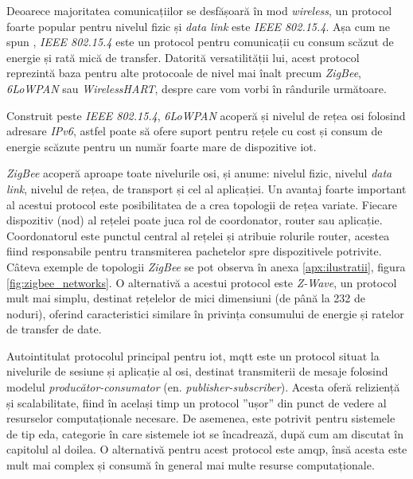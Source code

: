 Deoarece majoritatea comunicațiilor se desfășoară în mod \textit{wireless}, un protocol foarte popular pentru nivelul fizic și \textit{data link} este \textit{IEEE 802.15.4}. Așa cum ne spun \citet{Lin2017}, \textit{IEEE 802.15.4} este un protocol pentru comunicații cu consum scăzut de energie și rată mică de transfer. Datorită versatilității lui, acest protocol reprezintă baza pentru alte protocoale de nivel mai înalt precum \textit{ZigBee}, \textit{6LoWPAN} sau \textit{WirelessHART}, despre care vom vorbi în rândurile următoare.

Construit peste \textit{IEEE 802.15.4}, \textit{6LoWPAN} acoperă și nivelul de rețea \acrshort{osi} folosind adresare \textit{IPv6}, astfel poate să ofere suport pentru rețele cu cost și consum de energie scăzute pentru un număr foarte mare de dispozitive \acrshort{iot}.

\textit{ZigBee} acoperă aproape toate nivelurile \acrshort{osi}, și anume: nivelul fizic, nivelul \textit{data link}, nivelul de rețea, de transport și cel al aplicației. Un avantaj foarte important al acestui protocol este posibilitatea de a crea topologii de rețea variate. Fiecare dispozitiv (nod) al rețelei poate juca rol de coordonator, router sau aplicație. Coordonatorul este punctul central al rețelei și atribuie rolurile router, acestea fiind responsabile pentru transmiterea pachetelor spre dispozitivele potrivite. Câteva exemple de topologii \textit{ZigBee} se pot observa în anexa \ref{apx:ilustratii}, figura \ref{fig:zigbee_networks}. O alternativă a acestui protocol este \textit{Z-Wave}, un protocol mult mai simplu, destinat rețelelor de mici dimensiuni (de până la 232 de noduri), oferind caracteristici similare în privința consumului de energie și ratelor de transfer de date.

Autointitulat protocolul principal pentru \acrshort{iot}, \acrfull{mqtt} este un protocol situat la nivelurile de sesiune și aplicație al \acrshort{osi}, destinat transmiterii de mesaje folosind modelul \textit{producător-consumator} (en. \textit{publisher-subscriber}). Acesta oferă reliziență și scalabilitate, fiind în același timp un protocol ”ușor” din punct de vedere al resurselor computaționale necesare. De asemenea, este potrivit pentru sistemele de tip \acrshort{eda}, categorie în care sistemele \acrshort{iot} se încadrează, după cum am discutat în capitolul al doilea. O alternativă pentru acest protocol este \acrfull{amqp}, însă acesta este mult mai complex și consumă în general mai multe resurse computaționale.

